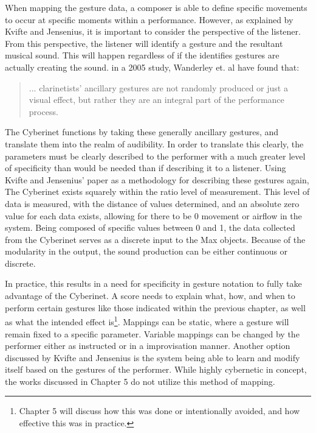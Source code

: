 When mapping the gesture data, a composer is able to define specific movements to occur at specific moments within a performance. However, as explained by Kvifte and Jensenius, it is important to consider the perspective of the listener\cite{KvifteJenseniusDescription}. From this perspective, the listener will identify a gesture and the resultant musical sound. This will happen regardless of if the identifies gestures are actually creating the sound. in a 2005 study, Wanderley et. al have found that:

\begin{quote}
    ... clarinetists' ancillary gestures are not randomly produced or just a visual effect, but rather they are an integral part of the performance process\cite{wanderleyClarinetGesture2005}.
\end{quote}

The Cyberinet functions by taking these generally ancillary gestures, and translate them into the realm of audibility. In order to translate this clearly, the parameters must be clearly described to the performer with a much greater level of specificity than would be needed than if describing it to a listener\cite{KvifteJenseniusDescription}. Using Kvifte and Jensenius' paper as a methodology for describing these gestures again, The Cyberinet exists squarely within the ratio level of measurement. This level of data is measured, with the distance of values determined, and an absolute zero value for each data exists, allowing for there to be 0 movement or airflow in the system. Being composed of specific values between 0 and 1, the data collected from the Cyberinet serves as a discrete input to the Max objects. Because of the modularity in the output, the sound production can be either continuous or discrete.

In practice, this results in a need for specificity in gesture notation to fully take advantage of the Cyberinet. A score needs to explain what, how, and when to perform certain gestures like those indicated within the previous chapter, as well as what the intended effect is\footnote{Chapter 5 will discuss how this was done or intentionally avoided, and how effective this was in practice.}. Mappings can be static, where a gesture will remain fixed to a specific parameter. Variable mappings can be changed by the performer either as instructed or in a improvisation manner. Another option discussed by Kvifte and Jensenius is the system being able to learn and modify itself based on the gestures of the performer\cite{KvifteJenseniusDescription}. While highly cybernetic in concept, the works discussed in Chapter 5 do not utilize this method of mapping.

